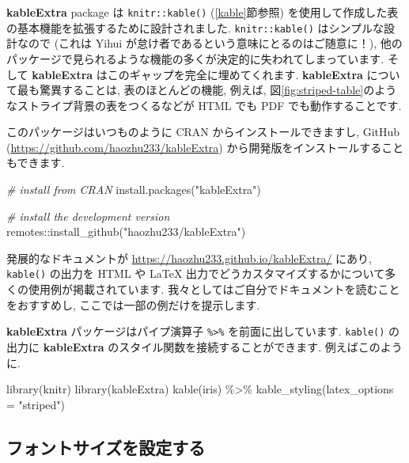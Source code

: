 \documentclass[
  11pt,
  lualatex,ja=standard,jafont=noto]{bxjsreport}
\newenvironment{Shaded}{\begin{snugshade}}{\end{snugshade}}
\newcommand{\AttributeTok}[1]{\textcolor[rgb]{0.77,0.63,0.00}{#1}}
\newcommand{\CommentTok}[1]{\textcolor[rgb]{0.56,0.35,0.01}{\textit{#1}}}
\newcommand{\FunctionTok}[1]{\textcolor[rgb]{0.00,0.00,0.00}{#1}}
\newcommand{\NormalTok}[1]{#1}
\newcommand{\SpecialCharTok}[1]{\textcolor[rgb]{0.00,0.00,0.00}{#1}}
\newcommand{\StringTok}[1]{\textcolor[rgb]{0.31,0.60,0.02}{#1}}
\begin{document}
\textbf{kableExtra} package \autocite{R-kableExtra}は \texttt{knitr::kable()} (\ref{kable}節参照) を使用して作成した表の基本機能を拡張するために設計されました. \texttt{knitr::kable()} はシンプルな設計なので (これは Yihui が怠け者であるという意味にとるのはご随意に！), 他のパッケージで見られるような機能の多くが決定的に失われてしまっています. そして \textbf{kableExtra} はこのギャップを完全に埋めてくれます. \textbf{kableExtra} について最も驚異することは, 表のほとんどの機能, 例えば, 図\ref{fig:striped-table}のようなストライプ背景の表をつくるなどが HTML でも PDF でも動作することです.

このパッケージはいつものように CRAN からインストールできますし, GitHub (\url{https://github.com/haozhu233/kableExtra}) から開発版をインストールすることもできます.

\begin{Shaded}
\begin{Highlighting}[numbers=left,,]
\CommentTok{\# install from CRAN}
\FunctionTok{install.packages}\NormalTok{(}\StringTok{"kableExtra"}\NormalTok{)}

\CommentTok{\# install the development version}
\NormalTok{remotes}\SpecialCharTok{::}\FunctionTok{install\_github}\NormalTok{(}\StringTok{"haozhu233/kableExtra"}\NormalTok{)}
\end{Highlighting}
\end{Shaded}

発展的なドキュメントが \url{https://haozhu233.github.io/kableExtra/} にあり, \texttt{kable()} の出力を HTML や LaTeX 出力でどうカスタマイズするかについて多くの使用例が掲載されています. 我々としてはご自分でドキュメントを読むことをおすすめし, ここでは一部の例だけを提示します.

\textbf{kableExtra} パッケージはパイプ演算子 \texttt{\%\textgreater{}\%} を前面に出しています. \texttt{kable()} の出力に \textbf{kableExtra} のスタイル関数を接続することができます. 例えばこのように.

\begin{Shaded}
\begin{Highlighting}[numbers=left,,]
\FunctionTok{library}\NormalTok{(knitr)}
\FunctionTok{library}\NormalTok{(kableExtra)}
\FunctionTok{kable}\NormalTok{(iris) }\SpecialCharTok{\%\textgreater{}\%}
  \FunctionTok{kable\_styling}\NormalTok{(}\AttributeTok{latex\_options =} \StringTok{"striped"}\NormalTok{)}
\end{Highlighting}
\end{Shaded}

\hypertarget{set-the-font-size}{%
\subsection{フォントサイズを設定する}\label{set-the-font-size}}
\end{document}
